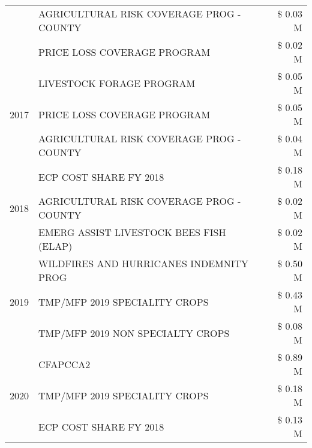 \begin{tabular}{llr}
 & AGRICULTURAL RISK COVERAGE PROG - COUNTY      & \$ 0.03 M \\
 & PRICE LOSS COVERAGE PROGRAM                   & \$ 0.02 M \\
\cline{1-3}
\multirow[t]{3}{*}{2017} & LIVESTOCK FORAGE PROGRAM & \$ 0.05 M \\
 & PRICE LOSS COVERAGE PROGRAM & \$ 0.05 M \\
 & AGRICULTURAL RISK COVERAGE PROG - COUNTY & \$ 0.04 M \\
\cline{1-3}
\multirow[t]{3}{*}{2018} & ECP COST SHARE FY 2018 & \$ 0.18 M \\
 & AGRICULTURAL RISK COVERAGE PROG - COUNTY & \$ 0.02 M \\
 & EMERG ASSIST LIVESTOCK BEES FISH (ELAP) & \$ 0.02 M \\
\cline{1-3}
\multirow[t]{3}{*}{2019} & WILDFIRES AND HURRICANES INDEMNITY PROG & \$ 0.50 M \\
 & TMP/MFP 2019 SPECIALITY CROPS & \$ 0.43 M \\
 & TMP/MFP 2019 NON SPECIALTY CROPS & \$ 0.08 M \\
\cline{1-3}
\multirow[t]{3}{*}{2020} & CFAPCCA2 & \$ 0.89 M \\
 & TMP/MFP 2019 SPECIALITY CROPS & \$ 0.18 M \\
 & ECP COST SHARE FY 2018 & \$ 0.13 M \\
\cline{1-3}
\bottomrule
\end{tabular}
